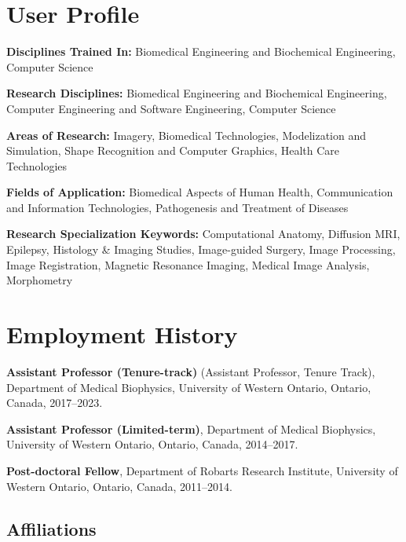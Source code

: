 
\section{User Profile}

\begin{description}
\item \textbf{Disciplines Trained In:} Biomedical Engineering and Biochemical Engineering, Computer Science
\item \textbf{Research Disciplines:} Biomedical Engineering and Biochemical Engineering, Computer Engineering and Software Engineering, Computer Science
\item \textbf{Areas of Research:} Imagery, Biomedical Technologies, Modelization and Simulation, Shape Recognition and Computer Graphics, Health Care Technologies
\item \textbf{Fields of Application:} Biomedical Aspects of Human Health, Communication and Information Technologies, Pathogenesis and Treatment of Diseases
\item \textbf{Research Specialization Keywords:} Computational Anatomy, Diffusion MRI, Epilepsy, Histology \& Imaging Studies, Image-guided Surgery, Image Processing, Image Registration, Magnetic Resonance Imaging, Medical Image Analysis, Morphometry
\end{description}

\section{Employment History}
		
\begin{description}
	
\item \textbf{Assistant Professor (Tenure-track)} (Assistant Professor, Tenure Track), Department of Medical Biophysics, University of Western Ontario, Ontario, Canada, 2017–2023.	

\item \textbf{Assistant Professor (Limited-term)}, Department of Medical Biophysics, University of Western Ontario, Ontario, Canada, 2014–2017.

\item \textbf{Post-doctoral Fellow}, Department of Robarts Research Institute, University of Western Ontario, Ontario, Canada, 2011–2014.
\end{description}


\subsection*{Affiliations}

